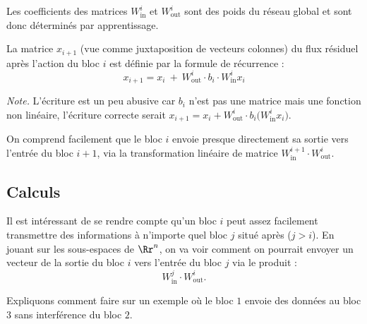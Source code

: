 \documentclass[11pt,class=report,crop=false]{standalone}
\begin{document}
Les coefficients des matrices $W_{\text{in}}^i$ et $W_{\text{out}}^i$ sont des poids du réseau global et sont donc déterminés par apprentissage.

La matrice $x_{i+1}$ (vue comme juxtaposition de vecteurs colonnes) du flux résiduel après l'action du bloc $i$ est définie par la formule de récurrence :
$$x_{i+1} = x_i \  + \ W_{\text{out}}^i \cdot b_i \cdot W_{\text{in}}^i x_i$$

\emph{Note.} L'écriture est un peu abusive car $b_i$ n'est pas une matrice mais une fonction non linéaire, l'écriture correcte serait $x_{i+1} = x_i + W_{\text{out}}^i \cdot b_i \big( W_{\text{in}}^i x_i \big)$.


On comprend facilement que le bloc $i$ envoie presque directement sa sortie vers l'entrée du bloc $i+1$, via la transformation linéaire de matrice 
$ W_{\text{in}}^{i+1} \cdot W_{\text{out}}^i$.



\subsection{Calculs}

Il est intéressant de se rendre compte qu'un bloc $i$ peut assez facilement transmettre des informations à n'importe quel bloc $j$ situé après ($j > i$).
En jouant sur les sous-espaces de $\Rr^n$, on va voir comment on pourrait envoyer un vecteur de la sortie du bloc $i$ vers l'entrée du bloc $j$ via le produit :
$$W_{\text{in}}^{j} \cdot W_{\text{out}}^i.$$


Expliquons comment faire sur un exemple où le bloc $1$ envoie des données au bloc $3$ sans interférence du bloc $2$.
\end{document}
